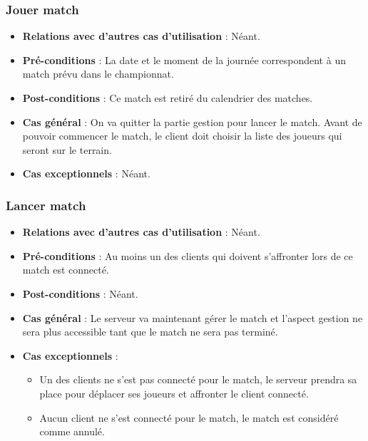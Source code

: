 \documentclass[a4paper,titlepage]{scrreprt}
\begin{document}
    \subsubsection{Jouer match}
      \begin{itemize}
        \item \textbf{Relations avec d'autres cas d'utilisation}  : Néant.
        \item \textbf{Pré-conditions} : La date et le moment de la journée correspondent à un match prévu dans le championnat.
        \item \textbf{Post-conditions} : Ce match est retiré du \gls{calendrier} des matches.
        \item \textbf{Cas général} : On va quitter la partie gestion pour lancer le match. Avant de pouvoir commencer le match, le client doit choisir la liste des joueurs qui seront sur le terrain. 
        \item \textbf{Cas exceptionnels} : Néant.
      \end{itemize}
    \subsubsection{Lancer match}
      \begin{itemize}
        \item \textbf{Relations avec d'autres cas d'utilisation}  : Néant.
        \item \textbf{Pré-conditions} : Au moins un des clients qui doivent s’affronter lors de ce match est connecté.
        \item \textbf{Post-conditions} : Néant.
        \item \textbf{Cas général} : Le serveur va maintenant gérer le match et l’aspect gestion ne sera plus accessible tant que le match ne sera pas terminé.
        \item \textbf{Cas exceptionnels} : 
          \begin{itemize}
            \item Un des clients ne s’est pas connecté pour le match, le serveur prendra sa place pour déplacer ses joueurs et affronter le client connecté.
			\item Aucun client ne s’est connecté pour le match, le match est considéré comme annulé.
          \end{itemize}    	
      \end{itemize}
\end{document}
